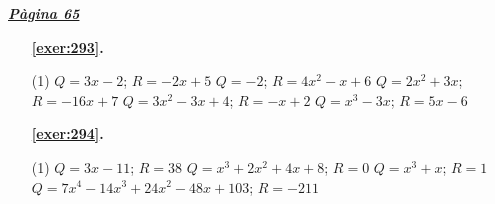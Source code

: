 
\hyperlink{page.65}{\textbf{\em Pàgina 65}}
\begin{enumerate}



 \item[\fontfamily{phv}\selectfont\color{blue}\textbf{\ref{exer:293}. }] \label{ans:293}
 \begin{tasks}[column-sep=1em, item-indent=1.3333em](1)
	 \task $Q=3x-2$; $R=-2x+5$
	 \task $Q=-2$; $R=4x^2-x+6$
	 \task $Q=2x^2+3x$; $R=-16x+7$
	 \task $Q=3x^2-3x+4$; $R=-x+2$
	 \task $Q=x^3-3x$; $R=5x-6$
\end{tasks}
 \end{enumerate}
\begin{enumerate}



 \item[\fontfamily{phv}\selectfont\color{blue}\textbf{\ref{exer:294}. }] \label{ans:294}
 \begin{tasks}[column-sep=1em, item-indent=1.3333em](1)
	 \task $Q=3x-11$; $R=38$
	 \task $Q=x^3+2x^2+4x+8$; $R=0$
	 \task $Q=x^3+x$; $R=1$
	 \task* $Q=7x^4-14x^3+24x^2-48x+103$; $R=-211$
\end{tasks}
 \end{enumerate}
\vspace{0.3cm}


